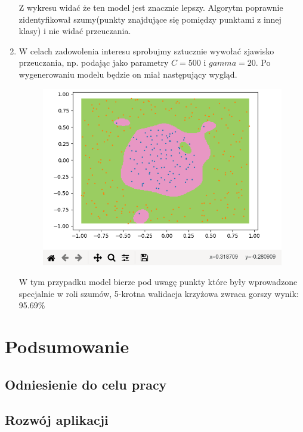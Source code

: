 \documentclass[paper=a4, fontsize=11pt]{scrartcl} %
\numberwithin{equation}{section} %
\numberwithin{figure}{section} %
\begin{document}
\begin{enumerate}[label={\textbf{Krok \theenumi :}},leftmargin=*]
    Z wykresu widać że ten model jest znacznie lepszy. Algorytm poprawnie zidentyfikował
    szumy(punkty znajdujące się pomiędzy punktami z innej klasy) i nie widać przeuczania. 

\item W celach zadowolenia interesu sprobujmy sztucznie wywołać zjawisko przeuczania, np.
    podając jako parametry $C=500$ i $gamma=20$. Po wygenerowaniu modelu będzie on miał
    następujący wygląd.

    \begin{figure}[H]
        \begin{center}
            \includegraphics[scale=0.69]{./img/ex3_st7.png}
        \end{center}
    \end{figure}

    W tym przypadku model bierze pod uwagę punkty które były wprowadzone specjalnie w roli
    szumów, 5-krotna walidacja krzyżowa zwraca gorszy wynik: 95.69\%

\end{enumerate}
    
\newpage
\section{Podsumowanie} %
\subsection{Odniesienie do celu pracy}
\subsection{Rozwój aplikacji}

\newpage
\nocite{*}
\printbibliography
\end{document}

